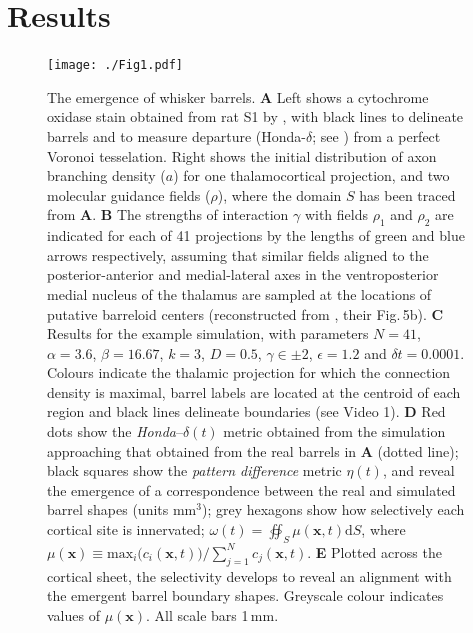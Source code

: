 \documentclass[9pt,lineno]{elife}
\newcommand{\cmnt}[1]{\textcolor{colcmnt}{#1}}
\newcommand{\mb}[1]{\mathbf{#1}}
\begin{document}
\section{Results}

\begin{figure}
  \begin{fullwidth}
    \texttt{[image: ./Fig1.pdf]}
    \caption{The emergence of whisker barrels.
      \textbf{A} Left shows a cytochrome oxidase stain obtained from rat S1
      by \cite{zheng_signal_2001}, with black lines to delineate barrels and to
      measure departure (Honda-$\delta$; see \citealp{senft_mouse_1991}) from a
      perfect Voronoi tesselation. Right shows the initial distribution of axon
      branching density ($a$) for one thalamocortical projection, and two
      molecular guidance fields ($\rho$), \cmnt{where the domain $S$ has been
        traced from \textbf{A}}.
      \textbf{B} The strengths of interaction $\gamma$ with fields $\rho_1$
      and $\rho_2$ are indicated for each of 41 projections by the lengths of
      green and blue arrows respectively, assuming that similar fields aligned
      to the posterior-anterior and medial-lateral axes in the ventroposterior
      medial nucleus of the thalamus are sampled at the locations of putative
      barreloid centers (reconstructed from \citealp{haidarliu_size_2001},
      their \cmnt{Fig.\,5b}).
      \textbf{C} Results for the example simulation, with parameters
      \cmnt{$N=41$, $\alpha=3.6$, $\beta=16.67$, $k=3$, $D=0.5$,
        $\gamma\in\pm 2$, $\epsilon=1.2$} and $\delta{t}=0.0001$. Colours
      indicate the thalamic projection for which the connection density is
      maximal, \cmnt{barrel labels are located at the centroid of each
        region and} black lines delineate boundaries (see Video 1).
      \textbf{D} Red dots show the \emph{Honda}--\cmnt{$\delta(t)$} metric
      obtained from \cmnt{the} simulation approaching that obtained from
      the \cmnt{real} barrels in \textbf{A} (dotted line); black squares
      show the \emph{pattern difference} metric $\eta(t)$, and reveal the
      emergence of a correspondence between the real and simulated barrel
      shapes (units mm$^3$); \cmnt{grey hexagons show how selectively each
        cortical site is innervated;
        $\omega(t) = \oiint_{S} \mu(\mb{x},t) \mathrm{d}S$, where
        $\mu(\mb{x}) \equiv \mathrm{max}_i\big(c_i(\mb{x},t)\big)\big/\sum_{j=1}^{N} c_j(\mb{x},t)$.}
      \textbf{E} \cmnt{Plotted across the cortical sheet, the selectivity
        develops to reveal an alignment with the emergent barrel boundary
        shapes}. \cmnt{Greyscale colour indicates values of $\mu(\mb{x})$.}
      All scale bars 1\,mm.}
    \label{fig:main}
  \end{fullwidth}
\end{figure}
\end{document}

